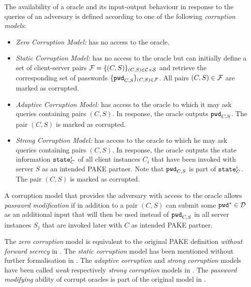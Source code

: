 \begin{definition}\label{def:corrmodels}
The availability of a \Corrupt oracle and its input-output behaviour in response to the queries of an adversary \cA is defined according to one of the following \emph{corruption models}:
\begin{itemize}
	\item\emph{Zero Corruption Model:} \cA has no access to the \Corrupt oracle.
	
	\item\emph{Static Corruption Model:} \cA has no access to the \Corrupt oracle but can initially define a set of client-server pairs $\mathcal{F}=\{(C,S)\}_{(C,S)\in\mathcal{C}\times\mathcal{S}}$ and retrieve the corresponding set of passwords $\{\mathtt{pwd}_{C,S}\}_{(C,S)\in \mathcal{F}}$.
		All pairs $(C,S)\in\mathcal{F}$ are marked as corrupted.
	
	\item\emph{Adaptive Corruption Model:} \cA has access to the \Corrupt oracle to which it may ask queries containing pairs $(C, S)$.
		In response, the oracle outputs $\mathtt{pwd}_{C,S}$. The pair $(C,S)$ is marked as corrupted.
	
	\item\emph{Strong Corruption Model:} \cA has access to the \Corrupt oracle to which he may ask queries containing pairs $(C, S)$.
		In response, the oracle outputs the state information $\mathtt{state}^i_C$ of all client instances $C_i$ that have been invoked with server $S$ as an intended PAKE partner.
			Note that $\mathtt{pwd}_{C,S}$ is part of $\mathtt{state}^i_C$.
			The pair $(C,S)$ is marked as corrupted.
	
\end{itemize}

\noindent
A corruption model that provides the adversary \cA with access to the \Corrupt oracle allows \emph{password modification} if in addition to a pair $(C,S)$ \cA can submit some $\mathtt{pwd}^\ast\in\mathcal{D}$ as an additional input that will then be used instead of $\mathtt{pwd}_{C,S}$ in all server instances $S_j$ that are invoked later with $C$ as intended \ac{PAKE} partner.
\end{definition}

\noindent
The \emph{zero corruption} model is equivalent to the original PAKE definition \emph{without forward secrecy} in \cite{Bellare2000,Abdalla2005}.
The \emph{static corruption} model has been mentioned without further formalisation in \cite{Abdalla2005,Gennaro2008}.
The \emph{adaptive corruption} and \emph{strong corruption} models have been called \emph{weak} respectively \emph{strong corruption} models in \cite{Bellare2000}.
The \emph{password modifying} ability of corrupt oracles is part of the original model in \cite{Bellare2000}.

